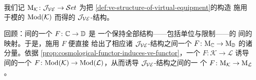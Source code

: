 我们记 $\mathrm{M}_{\mathcal{K}}\colon \mathcal{J}_{\mathcal{VE}}\to\mathcal{S}et$ 为把%
\cref{def:ve-structure-of-virtual-equipment}的构造
施用于模的\trVirtualEquipment{} $\mathrm{Mod}(\mathcal{K})$ 而得的 $\mathcal{J}_{\mathcal{VE}}$-结构。

\begin{remark}\label{rem:natural-transformation-of-structures}
回顾：\trVirtualEquipment{}间的一个\trFunctor{} $F\colon\mathbb{C}\to\mathbb{D}$ 是
一个保持全部结构——包括单位\trCell{}与限制\trCell——的%
\trVirtualDoubleCategory{}间的映射。于是，施用 $F$ 便直接
给出了相应诸 $\mathcal{J}_{\mathcal{VE}}$-结构之间一个\trNaturalTransformation{}
$F\colon\mathrm{M}_{\mathbb{C}}\to\mathrm{M}_{\mathbb{D}}$ 的诸分量。依据%
\cref{prop:cosmological-functor-induces-ve-functor}，一个\trCosmologicalFunctor{}
$F\colon\mathcal{K}\to\mathcal{L}$ 诱导\trVirtualEquipment{}间的一个\trFunctor{}
$F\colon\mathrm{Mod}(\mathcal{K})\to\mathrm{Mod}(\mathcal{L})$，从而诱导 $\mathcal{J}_{\mathcal{VE}}$-结构之间的一
个\trNaturalTransformation{} $F\colon\mathrm{M}_{\mathcal{K}}\to\mathrm{M}_{\mathcal{L}}$。
\end{remark}


